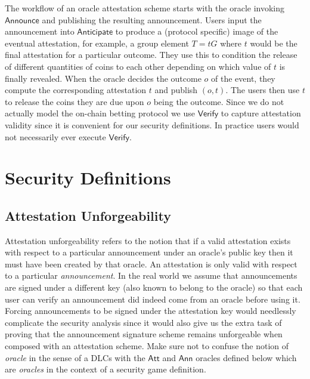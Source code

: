 \documentclass[runningheads]{llncs}
\newcommand{\Verify}{\mathsf{Verify}}
\newcommand{\Announce}{\mathsf{Announce}}
\newcommand{\AnnO}{\mathsf{Ann}}
\newcommand{\AttO}{\mathsf{Att}}
\newcommand{\Anticipate}{\mathsf{Anticipate}}
\newcommand{\att}{t}
\newcommand{\Att}{T}
\begin{document}
The workflow of an oracle attestation scheme starts with the oracle invoking $\Announce$ and publishing the resulting announcement.
Users input the announcement into $\Anticipate$ to produce a (protocol specific) image of the eventual attestation, for example, a group element $\Att = \att{}G$ where $\att$ would be the final attestation for a particular outcome.
They use this to condition the release of different quantities of coins to each other depending on which value of $\att$ is finally revealed.
When the oracle decides the outcome $o$ of the event, they compute the corresponding attestation $\att$ and publish $(o,\att)$.
The users then use $\att$ to release the coins they are due upon $o$ being the outcome.
Since we do not actually model the on-chain betting protocol we use $\Verify$ to capture attestation validity since it is convenient for our security definitions.
In practice users would not necessarily ever execute $\Verify$.

\section{Security Definitions}

\subsection{Attestation Unforgeability}

Attestation unforgeability refers to the notion that if a valid attestation exists with respect to a particular announcement under an oracle's public key then it must have been created by that oracle.
An attestation is only valid with respect to a particular \emph{announcement}.
In the real world we assume that announcements are signed under a different key (also known to belong to the oracle) so that each user can verify an announcement did indeed come from an oracle before using it.
Forcing announcements to be signed under the attestation key would needlessly complicate the security analysis since it would also give us the extra task of proving that the announcement signature scheme remains unforgeable when composed with an attestation scheme.
Make sure not to confuse the notion of \emph{oracle} in the sense of a DLCs with the $\AttO$ and $\AnnO$ oracles defined below which are \emph{oracles} in the context of a security game definition.
\end{document}
